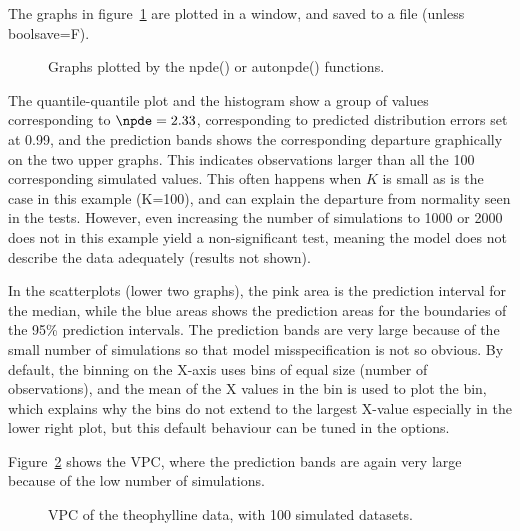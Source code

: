 \hskip 18pt The graphs in figure~\ref{fig:respde} are plotted in a window, and saved to a file (unless {\sf boolsave=F}).
\begin{figure}[!h]
\par\kern -0.3cm
\begin{center}
\end{center}
\caption{Graphs plotted by the {\sf npde()} or {\sf autonpde()}
functions.}\label{fig:respde}
\end{figure}
The quantile-quantile plot and the histogram show a group of values corresponding to $\npde=2.33$, corresponding to predicted distribution errors set at 0.99, and the prediction bands shows the corresponding departure graphically on the two upper graphs. This indicates observations larger than all the 100 corresponding simulated values. This often happens when $K$ is small as is the case in this example (K=100), and can explain the departure from normality seen in the tests. However, even increasing the number of simulations to 1000 or 2000 does not in this example yield a non-significant test, meaning the model does not describe the data adequately (results not shown).

In the scatterplots (lower two graphs), the pink area is the prediction interval for the median, while the blue areas shows the prediction areas for the boundaries of the 95\% prediction intervals. The prediction bands are very large because of the small number of simulations so that model misspecification is not so obvious. By default, the binning on the X-axis uses bins of equal size (number of observations), and the mean of the X values in the bin is used to plot the bin, which explains why the bins do not extend to the largest X-value especially in the lower right plot, but this default behaviour can be tuned in the options.

Figure~\ref{fig:theovpc} shows the VPC, where the prediction bands are again very large because of the low number of simulations.
\begin{figure}[!h]
\par\kern -0.3cm
\begin{center}
\end{center}
\caption{VPC of the theophylline data, with 100 simulated datasets.}\label{fig:theovpc}
\end{figure}

\newpage
